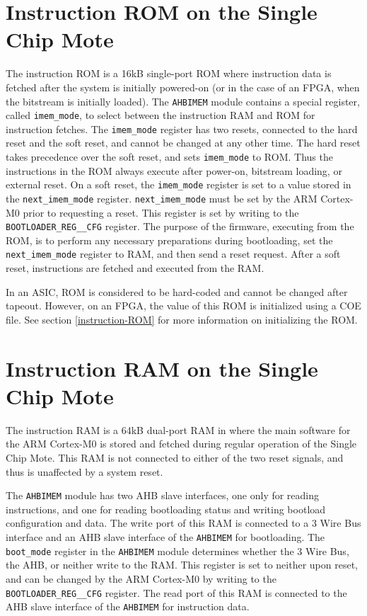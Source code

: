  \section{Instruction ROM on the Single Chip Mote}
The instruction ROM is a 16kB single-port ROM where instruction data is fetched after the system is initially powered-on (or in the case of an FPGA, when the bitstream is initially loaded). The \texttt{AHBIMEM} module contains a special register, called \texttt{imem\_mode}, to select between the instruction RAM and ROM for instruction fetches. The \texttt{imem\_mode} register has two resets, connected to the hard reset and the soft reset, and cannot be changed at any other time. The hard reset takes precedence over the soft reset, and sets \texttt{imem\_mode} to ROM. Thus the instructions in the ROM always execute after power-on, bitstream loading, or external reset. On a soft reset, the \texttt{imem\_mode} register is set to a  value stored in the \texttt{next\_imem\_mode} register. \texttt{next\_imem\_mode} must be set by the ARM Cortex-M0 prior to requesting a reset. This register is set by writing to the \texttt{BOOTLOADER\_REG\_\_CFG} register. The purpose of the firmware, executing from the ROM, is to perform any necessary preparations during bootloading, set the \texttt{next\_imem\_mode} register to RAM, and then send a reset request. After a soft reset, instructions are fetched and executed from the RAM.
 
 In an ASIC, ROM is considered to be hard-coded and cannot be changed after tapeout. However, on an FPGA, the value of this ROM is initialized using a COE file. See section \ref{instruction-ROM} for more information on initializing the ROM.
 
 \section{Instruction RAM on the Single Chip Mote}
 The instruction RAM is a 64kB dual-port RAM in where the main software for the ARM Cortex-M0 is stored and fetched during regular operation of the Single Chip Mote. This RAM is not connected to either of the two reset signals, and thus is unaffected by a system reset.
 
 The \texttt{AHBIMEM} module has two AHB slave interfaces, one only for reading instructions, and one for reading bootloading status and writing bootload configuration and data. The write port of this RAM is connected to a 3 Wire Bus interface and an AHB slave interface of the \texttt{AHBIMEM} for bootloading. The \texttt{boot\_mode} register in the \texttt{AHBIMEM} module determines whether the 3 Wire Bus, the AHB, or neither write to the RAM. This register is set to neither upon reset, and can be changed by the ARM Cortex-M0 by writing to the  \texttt{BOOTLOADER\_REG\_\_CFG} register. The read port of this RAM is connected to the AHB slave interface of the \texttt{AHBIMEM} for instruction data.
 
